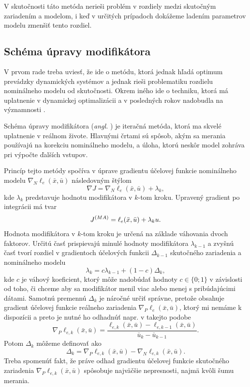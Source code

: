 V skutočnosti táto metóda nerieši problém v rozdiely medzi skutočným zariadením a modelom, i keď v určitých prípadoch dokážeme ladením parametrov modelu zmenšiť tento rozdiel.

\subsection{Schéma úpravy modifikátora}
V prvom rade treba uviesť, že ide o metódu, ktorá jednak hľadá optimum prevádzky dynamických systémov a jednak rieši problematiku rozdielu nominálneho modelu od skutočnosti. Okrem iného ide o techniku, ktorá má uplatnenie v dynamickej optimalizácii a v posledných rokov nadobudla na významnosti \cite{marchetti:modifier_adapt_scheme:2020}.

Schéma úpravy modifikátora (\textit{angl. }) je iteračná metóda, ktorá ma skvelé uplatnenie v reálnom živote. Hlavnými črtami sú spôsob, akým sa merania používajú na korekciu nominálneho modelu, a úloha, ktorú neskôr model zohráva pri výpočte ďalších vstupov.

Princíp tejto metódy spočíva v úprave gradientu účelovej funkcie nominálneho modelu $ \nabla_N\ell_e(\bar{x},\bar{u}) $ následovným štýlom
\begin{equation}
	\nabla J = \nabla_N\ell_e(\bar{x},\bar{u}) + \lambda_k,
\end{equation}
kde $ \lambda_k $ predstavuje hodnotu modifikátora v $ k $-tom kroku. Upravený gradient po integrácii má tvar 
\begin{equation}
	J^{\tiny{(MA)}} = \ell_e(\bar{x},\bar{u}) + \lambda_ku.
\end{equation}
Hodnota modifikátora v $ k $-tom kroku je určená na základe váhovania dvoch faktorov. Určitú časť prispievajú minulé hodnoty modifikátora $ \lambda_{k-1} $ a zvyšnú časť tvorí rozdiel v gradientoch účelových funkcii $ \Delta_{k-1} $ skutočného zariadenia a nominálneho modelu 
\begin{equation}
	\label{eq:mas_weight}
	\lambda_k = c\lambda_{k-1} + \left(1 - c\right)\Delta_{k},
\end{equation}
kde $ c $ je váhový koeficient, ktorý môže nadobúdať hodnoty $ c \in \lbrace 0; 1 \rbrace $ v závislosti od toho, či chceme aby sa modifikátor menil viac alebo menej s pribúdajúcimi dátami. Samotnú premennú $ \Delta_k $ je náročné určiť správne, pretože obsahuje gradient účelovej funkcie reálneho zariadenia $ \nabla_P\ell_e(\bar{x},\bar{u}) $, ktorý mi nemáme k dispozícii a preto je nutné ho odhadnúť napr. v takejto podobe
\begin{equation}
	\nabla_P\ell_{e,k}(\bar{x},\bar{u}) = \frac{\ell_{e,k}(\bar{x},\bar{u}) - \ell_{e,k-1}(\bar{x},\bar{u})}{\bar{u}_k - \bar{u}_{k-1}}.
\end{equation} 
Potom $ \Delta_k $ môžeme definovať ako 
\begin{equation}
	\label{eq:mas_correction}
	\Delta_k = \nabla_P\ell_{e,k}(\bar{x},\bar{u}) - \nabla_N\ell_{e,k}(\bar{x},\bar{u}).
\end{equation}
Treba spomenúť fakt, že práve odhad gradientu účelovej funkcie skutočného zariadenia $ \nabla_P\ell_{e,k}(\bar{x},\bar{u}) $ spôsobuje najväčšie nepresnosti, najmä kvôli šumu merania. 

